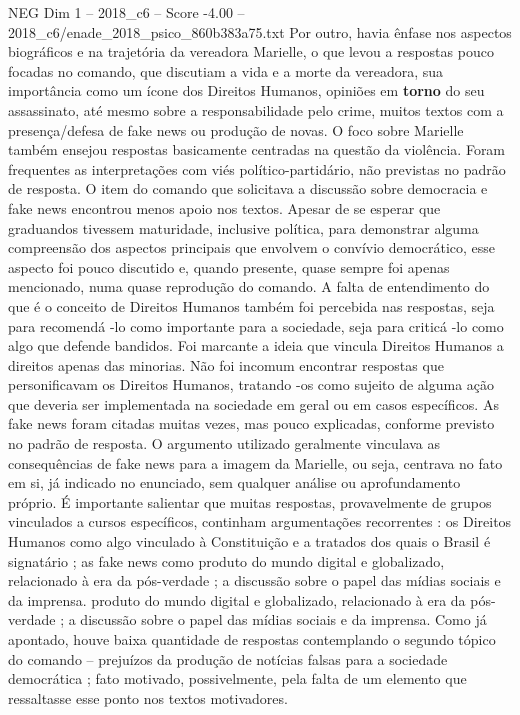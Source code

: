 \begin{textsample}{NEG Dim 1 – 2018\_c6 – Score -4.00 – 2018\_c6/enade\_2018\_psico\_860b383a75.txt}
Por outro, havia ênfase nos aspectos biográficos e na trajetória da vereadora Marielle, o que levou a respostas pouco focadas no comando, que discutiam a vida e a morte da vereadora, sua importância como um ícone dos Direitos Humanos, opiniões em \textbf{torno} do seu assassinato, até mesmo sobre a responsabilidade pelo crime, muitos textos com a presença/defesa de fake news ou produção de novas.
O foco sobre Marielle também ensejou respostas basicamente centradas na questão da violência.
Foram frequentes as interpretações com viés político-partidário, não previstas no padrão de resposta.
O item do comando que solicitava a discussão sobre democracia e fake news encontrou menos apoio nos textos.
Apesar de se esperar que graduandos tivessem maturidade, inclusive política, para demonstrar alguma compreensão dos aspectos principais que envolvem o convívio democrático, esse aspecto foi pouco discutido e, quando presente, quase sempre foi apenas mencionado, numa quase reprodução do comando.
A falta de entendimento do que é o conceito de Direitos Humanos também foi percebida nas respostas, seja para recomendá -lo como importante para a sociedade, seja para criticá -lo como algo que defende bandidos.
Foi marcante a ideia que vincula Direitos Humanos a direitos apenas das minorias.
Não foi incomum encontrar respostas que personificavam os Direitos Humanos, tratando -os como sujeito de alguma ação que deveria ser implementada na sociedade em geral ou em casos específicos.
As fake news foram citadas muitas vezes, mas pouco explicadas, conforme previsto no padrão de resposta.
O argumento utilizado geralmente vinculava as consequências de fake news para a imagem da Marielle, ou seja, centrava no fato em si, já indicado no enunciado, sem qualquer análise ou aprofundamento próprio.
É importante salientar que muitas respostas, provavelmente de grupos vinculados a cursos específicos, continham argumentações recorrentes : os Direitos Humanos como algo vinculado à Constituição e a tratados dos quais o Brasil é signatário ; as fake news como produto do mundo digital e globalizado, relacionado à era da pós-verdade ; a discussão sobre o papel das mídias sociais e da imprensa. produto do mundo digital e globalizado, relacionado à era da pós-verdade ; a discussão sobre o papel das mídias sociais e da imprensa.
Como já apontado, houve baixa quantidade de respostas contemplando o segundo tópico do comando – prejuízos da produção de notícias falsas para a sociedade democrática ; fato motivado, possivelmente, pela falta de um elemento que ressaltasse esse ponto nos textos motivadores.

\end{textsample}
